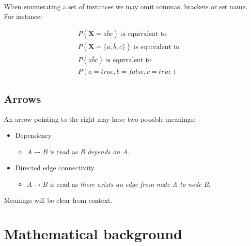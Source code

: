 \documentclass[a4paper,10pt]{article}
\theoremstyle{plain}
\begin{document}
\begin{appendices}
When enumerating a set of instances we may omit commas, brackets or set name. For instance:

\begin{align*}
  &P(\mathbf{X}=a\overline{b}c) \text{~is equivalent to} \\
  &P(\mathbf{X}=\{a, \overline{b}, c\}) \text{~is equivalent to} \\
  &P(a\overline{b}c) \text{~is equivalent to} \\
  &P(a=true,b=false,c=true)
\end{align*}

\subsection{Arrows}

An arrow pointing to the right may have two possible meanings:

\begin{itemize}
  \item Dependency
    \begin{itemize}
      \item $A \to B$ is read as \textit{B depends on A}.
    \end{itemize}
  \item Directed edge connectivity
    \begin{itemize}
      \item $A \to B$ is read as \textit{there exists an edge from node A to node B}.
    \end{itemize}
\end{itemize}

Meanings will be clear from context.

\section{Mathematical background}\label{app:bak}

\end{appendices}

\newpage

\printbibliography[heading=bibintoc]
\end{document}
